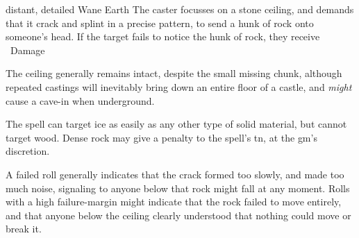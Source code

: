   {distant, detailed}%
  {Wane}%
  {Earth}%
  {}%
  {The caster focusses on a stone ceiling, and demands that it crack and splint in a precise pattern, to send a hunk of rock onto someone's head.
    If the target fails to notice the hunk of rock, they receive \showDam\ Damage}%
  {
    The ceiling generally remains intact, despite the small missing chunk, although repeated castings will inevitably bring down an entire floor of a castle, and \emph{might} cause a cave-in when underground.

    The spell can target ice as easily as any other type of solid material, but cannot target wood.
    Dense rock may give a penalty to the spell's \gls{tn}, at the \gls{gm}'s discretion.

    A failed roll generally indicates that the crack formed too slowly, and made too much noise, signaling to anyone below that rock might fall at any moment.
    Rolls with a high failure-margin might indicate that the rock failed to move entirely, and that anyone below the ceiling clearly understood that nothing could move or break it.
  }

